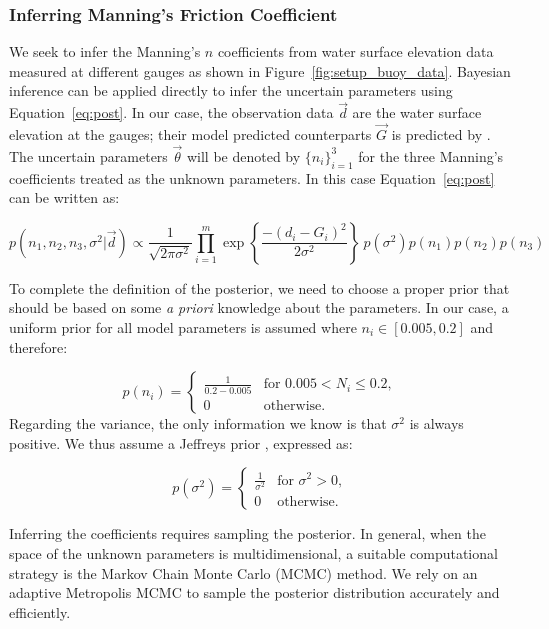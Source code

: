 \subsubsection{Inferring Manning's Friction Coefficient}
\label{sec:infmanning}
 
We seek to infer the Manning's $n$ coefficients from water surface elevation
data measured at different gauges as shown in Figure~\ref{fig:setup_buoy_data}.
Bayesian inference can be applied directly to infer the uncertain parameters
using Equation~\eqref{eq:post}. In our case, the observation data $\vec d$ 
are the water surface elevation at the gauges;
their model predicted counterparts $\vec G$ is predicted by \geoclaw.
The uncertain parameters $\vec \theta$ will be denoted by $\{n_i\}_{i=1}^3$ for the
three Manning's coefficients treated as the unknown parameters. 
In this case  Equation~\eqref{eq:post} can be written as:

\begin{equation} 
p(n_1,n_2,n_3,\sigma^2 | \vec d) 
\propto \frac{1}{\sqrt{2 \pi \sigma^2}} 
 \prod_{i=1}^m  
\exp \left\lbrace \frac{-(d_i - G_i)^2}{2 \sigma^2} \right\rbrace
\ p(\sigma^2)p(n_1)p(n_2) p(n_3)
\label{eq:post_coef}
\end{equation}

To complete the definition of the posterior, we need to choose a proper prior that should be based 
on some \emph{a priori} knowledge about the parameters. In our case, a uniform
prior for all model parameters is assumed where $n_i \in [0.005,0.2]$ and therefore:

\begin{equation} 
p(n_i) = \begin{cases}
		\displaystyle \frac{1}{0.2-0.005} &\text{for~} 0.005 <  N_i \leq 0.2 ,  \\
		0 &\text{otherwise}  .
\end{cases}
\end{equation}
Regarding the variance, the only information we know 
is that $\sigma^2$ is always positive.
We thus assume a Jeffreys prior \citep{sivia}, expressed as:

\begin{equation} 
p(\sigma^2) =  \begin{cases}
		\displaystyle \frac{1}{\sigma^2} &\text{for~} \sigma^2 > 0,  \\
		0 &\text{otherwise}. 
		\end{cases}
\label{eq:var_pr}
\end{equation}

Inferring the coefficients requires 
sampling the posterior. In general, when the space of the unknown 
parameters is multidimensional, a suitable computational strategy is 
the Markov Chain Monte  Carlo (MCMC) method. 
We rely on an adaptive Metropolis MCMC \citep{Gareth2009,Haario2001} to
sample the posterior distribution accurately and efficiently.


